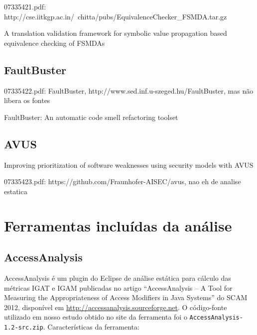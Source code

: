 07335421.pdf: http://cse.iitkgp.ac.in/~chitta/pubs/EquivalenceChecker\_FSMDA.tar.gz

A translation validation framework for symbolic value propagation based equivalence checking of FSMDAs

\subsection{FaultBuster}

07335422.pdf: FaultBuster, http://www.sed.inf.u-szeged.hu/FaultBuster, mas não libera os fontes

FaultBuster: An automatic code smell refactoring toolset

\subsection{AVUS}

Improving prioritization of software weaknesses using security models with AVUS

07335423.pdf: https://github.com/Fraunhofer-AISEC/avus, nao eh de analise estatica


\section{Ferramentas incluídas da análise}

\subsection{AccessAnalysis}

AccessAnalysis é um plugin do Eclipse de análise estática 
para cálculo das métricas IGAT e IGAM
publicadas no artigo ``AccessAnalysis -- A Tool for Measuring the
Appropriateness of Access Modifiers in Java Systems'' do SCAM 2012,
disponível em \url{http://accessanalysis.sourceforge.net}. O código-fonte
utilizado em nosso estudo obtido no site da ferramenta foi o
\texttt{AccessAnalysis-1.2-src.zip}. Características da ferramenta:

